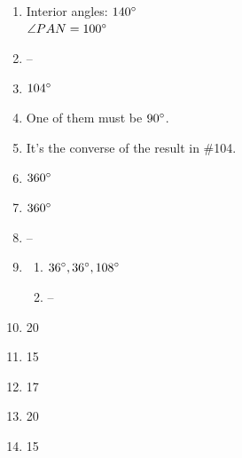 \documentclass{article}
\begin{document}
\begin{enumerate}
\begin{enumerate}
	\item $x = 10$
	
	\item $x = 60\degree$ \\
		$y = 140\degree$
	
	\item $x = 6$ \\
		$y = \frac{13}{2}$
		
	\item $z = 65 \degree$
	
	\item $x = 40$
	
	\end{enumerate}
	
\item Interior angles: $140 \degree$ \\
	$\angle PAN = 100 \degree$
	
\item --

\item $104 \degree$

\item One of them must be $90 \degree$.

\item It's the converse of the result in \#104.

\item $360 \degree$

\item $360 \degree$

\item --

\item

	\begin{enumerate}
	
	\item $36 \degree, 36 \degree, 108 \degree$
	
	\item --
	
	\end{enumerate}
	
\item 20

\item 15

\item 17

\item 20

\item 15


\end{enumerate}
\end{document}
